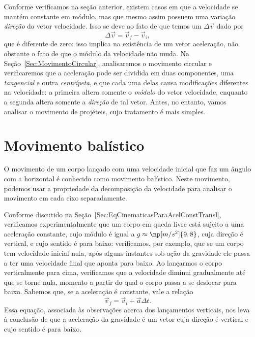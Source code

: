 Conforme verificamos na seção anterior, existem casos em que a velocidade se mantém constante em módulo, mas que mesmo assim possuem uma variação \emph{direção} do vetor velocidade. Isso se deve ao fato de que temos um $\Delta \vec{v}$ dado por
\begin{equation}
	\Delta \vec{v} = \vec{v}_f - \vec{v}_i,
\end{equation}
%
que é diferente de zero: isso implica na existência de um vetor aceleração, não obstante o fato de que o módulo da velocidade não muda. Na Seção~\eqref{Sec:MovimentoCircular}, analisaremos o movimento circular e verificaremos que a aceleração pode ser dividida em duas componentes, uma \emph{tangencial} e outra \emph{centrípeta}, e que cada uma delas causa modificações diferentes na velocidade: a primeira altera somente o \emph{módulo} do vetor velocidade, enquanto a segunda altera somente a \emph{direção} de tal vetor. Antes, no entanto, vamos analisar o movimento de projéteis, cujo tratamento é mais simples.

\section{Movimento balístico}

O movimento de um corpo lançado com uma velocidade inicial que faz um ângulo com a horizontal é conhecido como movimento balístico. Neste movimento, podemos usar a propriedade da decomposição da velocidade para analisar o movimento em cada eixo separadamente.

Conforme discutido na Seção~\ref{Sec:EqCinematicasParaAcelConstTransl}, verificamos experimentalmente que um corpo em queda livre está sujeito a uma aceleração constante, cujo módulo é igual a $g \approx \np[m/s^2]{9,8}$, cuja direção é vertical, e cujo sentido é para baixo: verificamos, por exemplo, que se um corpo tem velocidade inicial nula, após alguns instantes sob ação da gravidade ele passa a ter uma velocidade final que aponta para baixo. Ao lançarmos o corpo verticalmente para cima, verificamos que a velocidade diminui gradualmente até que se torne nula, momento a partir do qual o corpo passa a se deslocar para baixo. Sabemos que, se a aceleração é constante, vale a relação
\begin{equation}
    \vec{v}_f = \vec{v}_i + \vec{a} \Delta t.
\end{equation}
%
Essa equação, associada às observações acerca dos lançamentos verticais, nos leva à conclusão de que a aceleração da gravidade é um vetor cuja direção é vertical e cujo sentido é para baixo.

